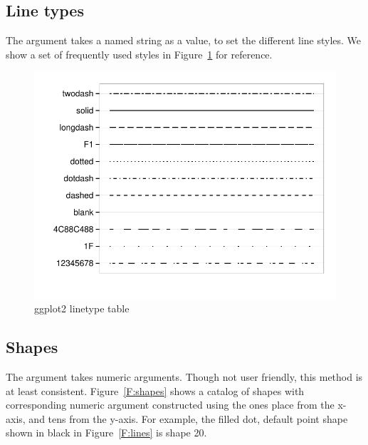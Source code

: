 \documentclass[nojss]{jss}\usepackage[]{graphicx}\usepackage[]{color}
\makeatletter
\def\maxwidth{ %
  \ifdim\Gin@nat@width>\linewidth
    \linewidth
  \else
    \Gin@nat@width
  \fi
}
\newenvironment{knitrout}{}{} %
\makeatother
\begin{document}
\subsection{Line types}\label{S:linetypes}
The  argument takes a named string as a value, to set the different line styles. We show a set of frequently used styles in Figure~\ref{F:linetypes} for reference.
\begin{knitrout}\footnotesize
{}\color{fgcolor}\begin{figure}[htpb]


{\centering \includegraphics[width=\maxwidth]{figure/beamer-linetypes} 

}

\caption[ggplot2 linetype table]{ggplot2 linetype table\label{F:linetypes}}
\end{figure}


\end{knitrout}

\subsection{Shapes}\label{S:shapes}
The  argument takes numeric arguments. Though not user friendly, this method is at least consistent. Figure~\ref{F:shapes} shows a catalog of shapes with corresponding numeric argument constructed using the ones place from the x-axis, and tens from the y-axis. For example, the filled dot, default point shape shown in black in Figure~\ref{F:lines} is shape 20.
\end{document}
